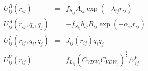 \documentclass[12pt]{article}
\begin{document}
\begin{eqnarray*}
U_{ij}^R(r_{ij}) & = & f_{S_{ij}} A_{ij} \exp (-\lambda_{ij} r_{ij}) \\
U_{ij}^A(r_{ij},q_i,q_j) & = & -f_{S_{ij}} b_{ij} B_{ij} \exp (-\alpha_{ij} r_{ij}) \\
U_{ij}^I(r_{ij},q_i,q_j) & = & J_{ij} (r_{ij}) q_i q_j \\
U_{ij}^V(r_{ij}) & = & f_{L_{ij}} (C_{VDW_i}C_{VDW_j})^\frac{1}{2}/r_{ij}^6 \\
\end{eqnarray*}                           
\end{document}
